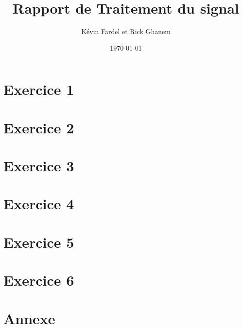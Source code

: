 \documentclass[a4paper, 11pt]{article}           %
\author{Kévin Fardel et Rick Ghanem}
\date{\today}
\title{Rapport de Traitement du signal}
\begin{document}

\maketitle %

\begin{abstract}
\end{abstract}

\tableofcontents %

\lstlistoflistings %

\newpage
\part{Exercice 1}

\part{Exercice 2}

\part{Exercice 3}

\part{Exercice 4}

\part{Exercice 5}

\part{Exercice 6}

\part{Annexe}

\end{document}
